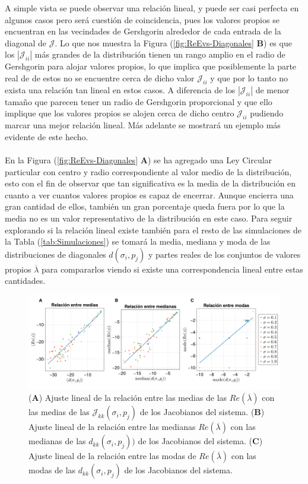 A simple vista se puede observar una relación lineal, y puede ser casi perfecta en algunos casos pero será cuestión de coincidencia, pues los valores propios se encuentran en las vecindades de Gershgorin alrededor de cada entrada de la diagonal de $\mathcal{J}$. Lo que nos muestra la Figura (\ref{fig:ReEvs-Diagonales} \textbf{B}) es que los $|\mathcal{J}_{ii}|$ más grandes de la distribución tienen un rango amplio en el radio de Gershgorin para alojar valores propios, lo que implica que posiblemente la parte real de de estos no se encuentre cerca de dicho valor $\mathcal{J}_{ii}$ y que por lo tanto no exista una relación tan lineal en estos casos.  A diferencia de los $|\mathcal{J}_{ii}|$ de menor tamaño que parecen tener un radio de Gershgorin proporcional y que ello implique que los valores propios se alojen cerca de dicho centro $\mathcal{J}_{ii}$ pudiendo marcar una mejor relación lineal. Más adelante se mostrará un ejemplo más evidente de este hecho.\\
\\
En la Figura (\ref{fig:ReEvs-Diagonales} \textbf{A}) se ha agregado una Ley Circular particular con centro y radio correspondiente al valor medio de la distribución, esto con el fin de observar que tan significativa es la media de la distribución en cuanto a ver cuantos valores propios es capaz de encerrar. Aunque encierra una gran cantidad de ellos, también un gran porcentaje queda fuera por lo que la media no es un valor representativo de la distribución en este caso. Para seguir explorando si la relación lineal existe también para el resto de las simulaciones de la Tabla (\ref{tab:Simulaciones}) se tomará la media, mediana y moda de las distribuciones de diagonales $d(\sigma_i,p_j)$ y partes reales de los conjuntos de valores propios $\overline{\lambda}$ para compararlos viendo si existe una correspondencia lineal entre estas cantidades.
\begin{figure}[h!]
	\centering
	\includegraphics[scale=0.16]{../Imagenes/AjustesLinMeds}
	\caption{(\textbf{A}) Ajuste lineal de la relación entre las medias de las $Re(\overline{\lambda})$ con las medias de las $\mathcal{J}_{kk}(\sigma_i,p_j)$ de los Jacobianos del sistema. (\textbf{B}) Ajuste lineal de la relación entre las medianas $Re(\overline{\lambda})$ con las medianas de las $d_{kk}(\sigma_i,p_j))$ de los Jacobianos del sistema. (\textbf{C}) Ajuste lineal de la relación entre las modas de $Re(\overline{\lambda})$ con las modas de las $d_{kk}(\sigma_i,p_j)$ de los Jacobianos del sistema.}
	\label{fig:AjustesLinMeds}
\end{figure}
\newpage

